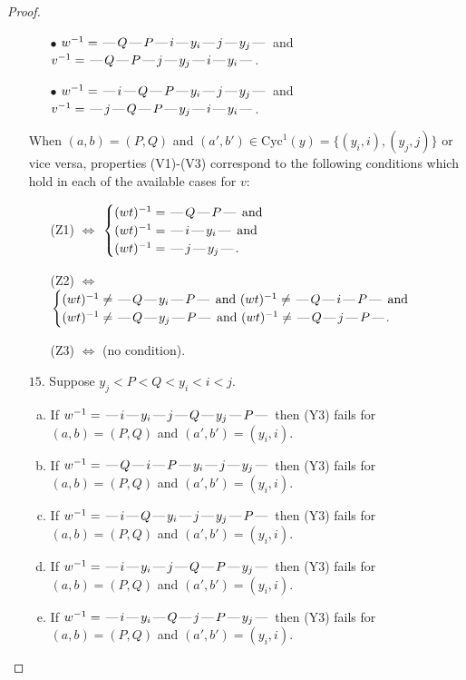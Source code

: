 \documentclass[10pt]{article}
\theoremstyle{definition}
\theoremstyle{definition}
\def\dash{\text{\hspace{0.5mm}---\hspace{0.5mm}}}
\def\Cyc{\mathrm{Cyc}}
\begin{document}
\begin{proof}
\begin{enumerate}
\begin{enumerate}
\item[$\bullet$] $w^{-1} = \dash Q\dash P\dash i\dash y_i\dash j\dash y_j\dash $ and $v^{-1} = \dash Q\dash P\dash j\dash y_j\dash i\dash y_i\dash $.
\item[$\bullet$] $w^{-1} = \dash i\dash Q\dash P\dash y_i\dash j\dash y_j\dash $ and $v^{-1} = \dash j\dash Q\dash P\dash y_j\dash i\dash y_i\dash $.
\end{enumerate}
When $(a,b)= (P,Q)$ and $(a',b')\in \Cyc^1(y)=\{(y_i,i),(y_j,j)\}$ or vice versa,
properties (V1)-(V3) correspond to the following conditions which hold in
each of the available cases for $v$:
\begin{enumerate}
\item[](Z1) $\Leftrightarrow$ $\begin{cases}\text{$(wt)^{-1} = \dash Q \dash P \dash$}\text{ and }\\
\text{$(wt)^{-1} = \dash i \dash y_i \dash$}\text{ and }\\
\text{$(wt)^{-1} = \dash j \dash y_j \dash$}.\end{cases}$
\item[](Z2) $\Leftrightarrow$ $\begin{cases}\text{$(wt)^{-1} \neq \dash Q \dash y_i \dash P \dash$ and $(wt)^{-1}\neq \dash Q \dash i \dash P \dash$}\text{ and }\\
\text{$(wt)^{-1} \neq \dash Q \dash y_j \dash P \dash$ and $(wt)^{-1}\neq \dash Q \dash j \dash P \dash$}.\end{cases}$
\item[](Z3) $\Leftrightarrow$ (no condition).
\end{enumerate}
\item[$15$.] Suppose $y_j < P < Q < y_i < i < j$.
\begin{enumerate}[(a)]
\item If $w^{-1} = \dash i\dash y_i\dash j\dash Q\dash y_j\dash P\dash $ then (Y3) fails for $(a,b)=(P,Q)$ and $(a',b')=(y_i,i)$.
\item If $w^{-1} = \dash Q\dash i\dash P\dash y_i\dash j\dash y_j\dash $ then (Y3) fails for $(a,b)=(P,Q)$ and $(a',b')=(y_i,i)$.
\item If $w^{-1} = \dash i\dash Q\dash y_i\dash j\dash y_j\dash P\dash $ then (Y3) fails for $(a,b)=(P,Q)$ and $(a',b')=(y_i,i)$.
\item If $w^{-1} = \dash i\dash y_i\dash j\dash Q\dash P\dash y_j\dash $ then (Y3) fails for $(a,b)=(P,Q)$ and $(a',b')=(y_i,i)$.
\item If $w^{-1} = \dash i\dash y_i\dash Q\dash j\dash P\dash y_j\dash $ then (Y3) fails for $(a,b)=(P,Q)$ and $(a',b')=(y_i,i)$.

\end{enumerate}
\end{enumerate}
\end{proof}
\end{document}
